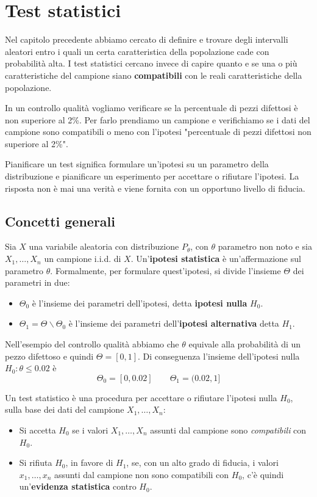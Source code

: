 \chapter{Test statistici}
Nel capitolo precedente abbiamo cercato di definire e trovare degli intervalli aleatori entro i
quali un certa caratteristica della popolazione cade con probabilità alta. I test statistici
cercano invece di capire quanto e se una o più caratteristiche del campione siano
\textbf{compatibili} con le reali caratteristiche della popolazione.

In un controllo qualità vogliamo verificare se la percentuale di pezzi difettosi è non superiore
al 2\%. Per farlo prendiamo un campione e verifichiamo se i dati del campione sono compatibili o
meno con l'ipotesi "percentuale di pezzi difettosi non superiore al 2\%".

Pianificare un test significa formulare un'ipotesi su un parametro della distribuzione e
pianificare un esperimento per accettare o rifiutare l'ipotesi. La risposta non è mai una verità
e viene fornita con un opportuno livello di fiducia.

\section{Concetti generali}
Sia $X$ una variabile aleatoria con distribuzione $P_\theta$, con $\theta$ parametro non noto e
sia $X_1, \dots, X_n$ un campione i.i.d. di $X$. Un'\textbf{ipotesi statistica} è un'affermazione
sul parametro $\theta$. Formalmente, per formulare quest'ipotesi, si divide l'insieme $\Theta$ dei
parametri in due:
\begin{itemize}
	\item $\Theta_0$ è l'insieme dei parametri dell'ipotesi, detta \textbf{ipotesi nulla} $H_0$.
	\item $\Theta_1 = \Theta \backslash \Theta_0$ è l'insieme dei parametri
	      dell'\textbf{ipotesi alternativa} detta $H_1$.
\end{itemize}

\begin{example}
	Nell'esempio del controllo qualità abbiamo che $\theta$ equivale alla probabilità di un pezzo
	difettoso e quindi $\Theta = [0, 1]$. Di conseguenza l'insieme dell'ipotesi nulla
	$H_0 : \theta \leq 0.02$ è
	\[ \Theta_0 = [0, 0.02] \qquad \Theta_1 = (0.02, 1] \]
\end{example}

Un test statistico è una procedura per accettare o rifiutare l'ipotesi nulla $H_0$, sulla base dei
dati del campione $X_1, \dots, X_n$:
\begin{itemize}
	\item Si accetta $H_0$ se i valori $X_1, \dots, X_n$ assunti dal campione sono
	      \emph{compatibili} con $H_0$.
	\item Si rifiuta $H_0$, in favore di $H_1$, se, con un alto grado di fiducia, i valori
	      $x_1, \dots, x_n$ assunti dal campione non sono compatibili con $H_0$, c'è quindi
	      un'\textbf{evidenza statistica} contro $H_0$.
\end{itemize}

